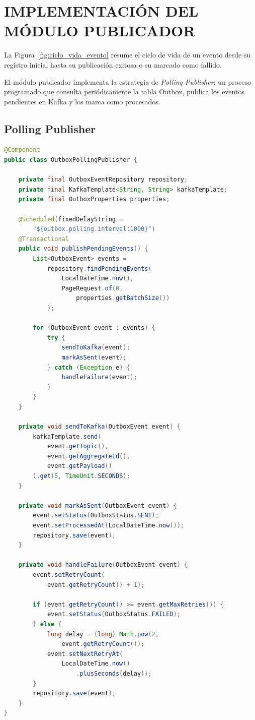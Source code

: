 \section{IMPLEMENTACIÓN DEL MÓDULO PUBLICADOR}

La Figura~\ref{fig:ciclo_vida_evento} resume el ciclo de vida de un evento desde su registro inicial hasta su publicación exitosa o su marcado como fallido.



El módulo publicador implementa la estrategia de \textit{Polling Publisher}: un proceso programado que consulta periódicamente la tabla Outbox, publica los eventos pendientes en Kafka y los marca como procesados.

\subsection{Polling Publisher}

\begin{lstlisting}[language=Java, caption={Componente de publicación periódica de eventos.}]
@Component
public class OutboxPollingPublisher {

    private final OutboxEventRepository repository;
    private final KafkaTemplate<String, String> kafkaTemplate;
    private final OutboxProperties properties;

    @Scheduled(fixedDelayString =
        "${outbox.polling.interval:1000}")
    @Transactional
    public void publishPendingEvents() {
        List<OutboxEvent> events =
            repository.findPendingEvents(
                LocalDateTime.now(),
                PageRequest.of(0,
                    properties.getBatchSize())
            );

        for (OutboxEvent event : events) {
            try {
                sendToKafka(event);
                markAsSent(event);
            } catch (Exception e) {
                handleFailure(event);
            }
        }
    }

    private void sendToKafka(OutboxEvent event) {
        kafkaTemplate.send(
            event.getTopic(),
            event.getAggregateId(),
            event.getPayload()
        ).get(5, TimeUnit.SECONDS);
    }

    private void markAsSent(OutboxEvent event) {
        event.setStatus(OutboxStatus.SENT);
        event.setProcessedAt(LocalDateTime.now());
        repository.save(event);
    }

    private void handleFailure(OutboxEvent event) {
        event.setRetryCount(
            event.getRetryCount() + 1);

        if (event.getRetryCount() >= event.getMaxRetries()) {
            event.setStatus(OutboxStatus.FAILED);
        } else {
            long delay = (long) Math.pow(2,
                event.getRetryCount());
            event.setNextRetryAt(
                LocalDateTime.now()
                    .plusSeconds(delay));
        }
        repository.save(event);
    }
}
\end{lstlisting}

